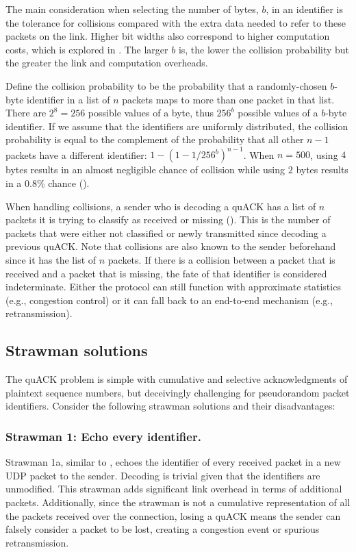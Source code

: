 The main consideration when selecting the number of bytes, $b$, in an identifier
is the tolerance for collisions compared with the extra data needed to refer to
these packets on the link. Higher bit widths also correspond to higher
computation costs, which is explored in .
The larger $b$ is, the lower the collision probability but the greater the link
and computation overheads.

Define the collision probability to be the probability that a randomly-chosen
$b$-byte identifier in a list of $n$ packets maps to more than one packet in
that list. There are $2^8=256$ possible values of a byte, thus $256^b$ possible
values of a $b$-byte identifier.
If we assume that the identifiers are uniformly distributed, the collision
probability is equal to the complement of the probability that all other $n-1$
packets have a different identifier: $1-(1 - 1/256^{b})^{n-1}$.
When $n=500$, using $4$ bytes results in an almost negligible
chance of collision while using $2$ bytes results in a 0.8\% chance
().



When handling collisions, a sender who is decoding a quACK has a list of $n$
packets it is trying to classify as received or missing
(). This is the number of packets that were either
not classified or newly transmitted since decoding a previous quACK.
Note that collisions are also known to the sender beforehand since it has the
list of $n$ packets. If there is a collision between a packet that is received
and a packet that is missing, the fate of that identifier is considered
indeterminate. Either the protocol can still function with approximate
statistics (e.g., congestion control) or it can fall back to an end-to-end
mechanism (e.g., retransmission).

\subsection{Strawman solutions}
\label{sec:quack:problem:strawmen}

The quACK problem is simple with cumulative and selective acknowledgments of
plaintext sequence numbers, but deceivingly challenging for pseudorandom
packet identifiers. Consider the following strawman solutions and their
disadvantages:

\subsubsection{Strawman 1: Echo every identifier.}
Strawman 1a, similar to \cite{li-tsvwg-loops-problem-opportunities-06,kramer2020lwpep},
echoes the identifier of every received packet in a new UDP packet to the
sender.  Decoding is trivial given that the identifiers are unmodified.
This strawman adds significant link overhead in terms of additional packets.
Additionally, since the strawman is not a cumulative representation of all the
packets received over the connection, losing a quACK means the
sender can falsely consider a packet to be lost, creating a congestion
event or spurious retransmission.

